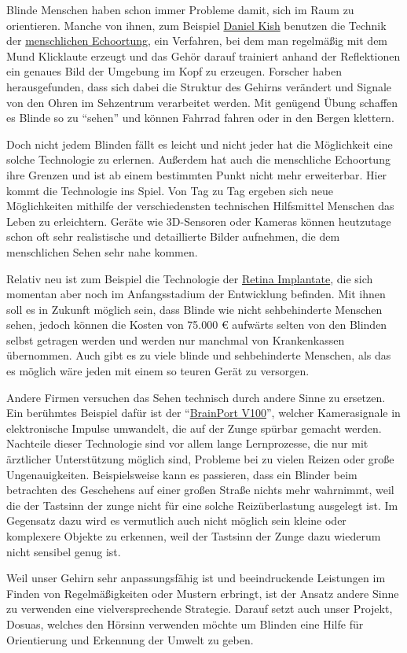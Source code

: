\documentclass[a4paper,12pt,ngerman]{scrartcl}
\begin{document}
Blinde Menschen haben schon immer Probleme damit, sich im Raum zu orientieren.
Manche von ihnen, zum Beispiel \href{https://en.wikipedia.org/wiki/Daniel_Kish}
{Daniel Kish} benutzen die Technik der \href{https://de.wikipedia.org/wiki/Menschliche_Echoortung}{menschlichen Echoortung}, ein Verfahren, bei dem
man regelmäßig mit dem Mund Klicklaute erzeugt und das Gehör darauf trainiert 
anhand der Reflektionen ein genaues Bild der Umgebung im Kopf zu erzeugen.
Forscher haben herausgefunden, dass sich dabei die Struktur des Gehirns verändert 
und Signale von den Ohren im Sehzentrum verarbeitet werden.
Mit genügend Übung schaffen es Blinde so zu \enquote{sehen} und können Fahrrad 
fahren oder in den Bergen klettern. \par 
Doch nicht jedem Blinden fällt es leicht und nicht jeder hat die Möglichkeit eine
solche Technologie zu erlernen. Außerdem hat auch die menschliche Echoortung ihre
Grenzen und ist ab einem bestimmten Punkt nicht mehr erweiterbar. Hier kommt die 
Technologie ins Spiel. Von Tag zu Tag ergeben sich neue Möglichkeiten mithilfe 
der verschiedensten technischen Hilfsmittel Menschen das Leben zu erleichtern.
Geräte wie 3D-Sensoren oder Kameras können heutzutage schon oft sehr realistische
und detaillierte Bilder aufnehmen, die dem menschlichen Sehen sehr nahe kommen. \par 
Relativ neu ist zum Beispiel die Technologie der 
\href{https://de.wikipedia.org/wiki/Retina-Implantat}{Retina Implantate}, die sich 
momentan aber noch im Anfangsstadium der Entwicklung befinden. Mit ihnen soll es in 
Zukunft möglich sein, dass Blinde wie nicht sehbehinderte Menschen sehen, jedoch
können die Kosten von 75.000 \euro{} aufwärts selten von den Blinden selbst getragen
werden und werden nur manchmal von Krankenkassen übernommen. Auch gibt es zu viele
blinde und sehbehinderte Menschen, als das es möglich wäre jeden mit einem so 
teuren Gerät zu versorgen.\par 
Andere Firmen versuchen das Sehen technisch durch andere Sinne zu ersetzen.
Ein berühmtes Beispiel dafür ist der 
\enquote{\href{https://www.wicab.com/brainport-v100}{BrainPort V100}}, welcher 
Kamerasignale in elektronische Impulse umwandelt, die auf der Zunge spürbar
gemacht werden. Nachteile dieser
Technologie sind vor allem lange Lernprozesse, die nur mit ärztlicher Unterstützung
möglich sind, Probleme bei zu vielen Reizen oder große Ungenauigkeiten.
Beispielsweise kann es passieren, dass ein Blinder beim betrachten des Geschehens auf 
einer großen Straße nichts mehr wahrnimmt, weil die der Tastsinn der zunge
nicht für eine 
solche Reizüberlastung ausgelegt ist. Im Gegensatz dazu wird es vermutlich auch nicht
möglich sein kleine oder komplexere Objekte zu erkennen, weil der Tastsinn der Zunge
dazu wiederum nicht sensibel genug ist. \par
Weil unser Gehirn sehr anpassungsfähig ist und beeindruckende
Leistungen im Finden von Regelmäßigkeiten oder Mustern erbringt, ist der Ansatz
andere Sinne zu verwenden eine vielversprechende Strategie. Darauf setzt auch 
unser Projekt, Dosuas, welches den Hörsinn verwenden möchte um Blinden eine Hilfe
für Orientierung und Erkennung der Umwelt zu geben.
 
\end{document}
